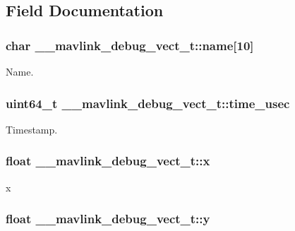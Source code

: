 \subsection{Field Documentation}
\hypertarget{struct____mavlink__debug__vect__t_a8547179b8e8db0e26704d23b474d5f0a}{
\subsubsection[{name}]{\setlength{\rightskip}{0pt plus 5cm}char \+\_\+\+\_\+mavlink\+\_\+debug\+\_\+vect\+\_\+t\+::name\mbox{[}10\mbox{]}}}\label{struct____mavlink__debug__vect__t_a8547179b8e8db0e26704d23b474d5f0a}


Name. 

\hypertarget{struct____mavlink__debug__vect__t_a8ce7a8e6e061bff40d49ca81fdd3ce33}{
\subsubsection[{time\+\_\+usec}]{\setlength{\rightskip}{0pt plus 5cm}uint64\+\_\+t \+\_\+\+\_\+mavlink\+\_\+debug\+\_\+vect\+\_\+t\+::time\+\_\+usec}}\label{struct____mavlink__debug__vect__t_a8ce7a8e6e061bff40d49ca81fdd3ce33}


Timestamp. 

\hypertarget{struct____mavlink__debug__vect__t_a9a222c84369ea74593be0625abb29bc8}{
\subsubsection[{x}]{\setlength{\rightskip}{0pt plus 5cm}float \+\_\+\+\_\+mavlink\+\_\+debug\+\_\+vect\+\_\+t\+::x}}\label{struct____mavlink__debug__vect__t_a9a222c84369ea74593be0625abb29bc8}


x 

\hypertarget{struct____mavlink__debug__vect__t_a400c1d51e5edb6686737999ae6e4aba7}{
\subsubsection[{y}]{\setlength{\rightskip}{0pt plus 5cm}float \+\_\+\+\_\+mavlink\+\_\+debug\+\_\+vect\+\_\+t\+::y}}\label{struct____mavlink__debug__vect__t_a400c1d51e5edb6686737999ae6e4aba7}


